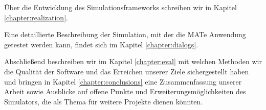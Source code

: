 Über die Entwicklung des Simulationsframeworks schreiben wir in Kapitel \ref{chapter:realization}.

Eine detaillierte Beschreibung der Simulation, mit der die MATe Anwendung getestet werden kann, findet sich im Kapitel \ref{chapter:dialogs}.

Abschließend beschreiben wir im Kapitel \ref{chapter:eval} mit welchen Methoden wir die Qualität der Software und das Erreichen unserer Ziele sichergestellt haben und bringen in Kapitel \ref{chapter:conclusions} eine Zusammenfassung unserer Arbeit sowie Ausblicke auf offene Punkte und Erweiterungsmöglichkeiten des Simulators, die als Thema für weitere Projekte dienen könnten.


